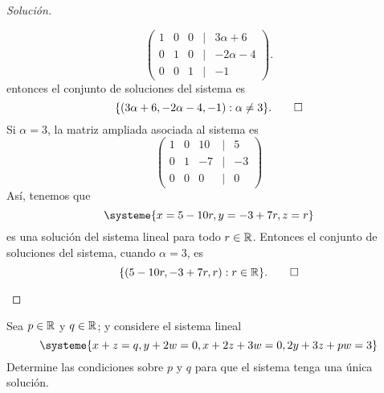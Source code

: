 \documentclass[a4,11pt]{aleph-notas}
\begin{document}
\begin{proof}[Solución]
\begin{enumerate}
    \[
        \begin{pmatrix}
        1&0&0&|& 3 \alpha+6\\
        0&1&0&|&-2\alpha - 4\\
        0&0&1&|& -1
        \end{pmatrix}               .
    \]
    entonces el conjunto de soluciones del sistema es 
    \[
        \{(3 \alpha+6,-2\alpha - 4,-1):\alpha \neq 3\}.\qedhere
    \]
    Si $\alpha = 3 $, la matriz ampliada asociada al sistema es
    \[
        \begin{pmatrix}
        1&0&10&|&5\\
        0&1&-7&|&-3\\
        0&0&0&|&0
        \end{pmatrix}
    \]
    Así, tenemos que
    \[
    \systeme{x = 5 - 10r, y= -3 +7r, z= r}
    \]
    es una solución del sistema lineal para todo $r \in \mathbb{R}$. Entonces el conjunto de soluciones del sistema, cuando $\alpha = 3$, es
    \[
        \{(5 - 10r,-3 +7r,r):r \in \mathbb{R}\}.\qedhere
    \]
    
 \end{enumerate}
\end{proof}


\begin{ejer}
    Sea $p \in \mathbb{R}$ y $q \in \mathbb{R}$; y considere el sistema lineal
    \[
    \systeme{x+z=q, y+2w=0, x+2z+3w=0, 2y+3z+pw=3}
    \]
    Determine las condiciones sobre $p$ y $q$ para que el sistema tenga una única solución.
\end{ejer}
\end{document}
